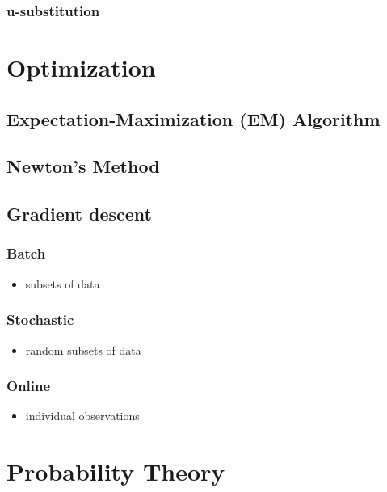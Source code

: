 \documentclass[]{article}
\providecommand{\tightlist}{%
  \setlength{\itemsep}{0pt}\setlength{\parskip}{0pt}}
\begin{document}
\subsection{u-substitution}

\chapter{Optimization}

\section{Expectation-Maximization (EM) Algorithm}

\section{Newton's Method}

\section{Gradient descent}

\subsection{Batch}

\begin{itemize}
\tightlist
\item
  subsets of data
\end{itemize}

\subsection{Stochastic}

\begin{itemize}
\tightlist
\item
  random subsets of data
\end{itemize}

\subsection{Online}

\begin{itemize}
\tightlist
\item
  individual observations
\end{itemize}

\chapter{Probability Theory}
\end{document}
